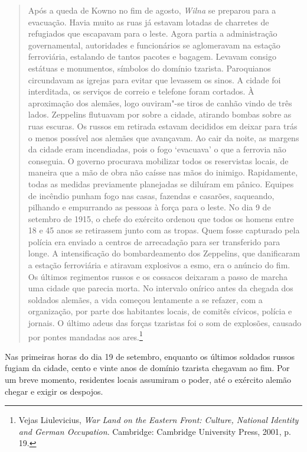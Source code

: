 \begin{quote}
Após a queda de Kowno no fim de agosto, \textit{Wilna} se preparou para a
evacuação. Havia muito as ruas já estavam lotadas de charretes de
refugiados que escapavam para o leste. Agora partia a administração
governamental, autoridades e funcionários se aglomeravam na estação
ferroviária, estalando de tantos pacotes e bagagem. Levavam consigo
estátuas e monumentos, símbolos do domínio tzarista. Paroquianos
circundavam as igrejas para evitar que levassem os sinos. A cidade foi
interditada, os serviços de correio e telefone foram cortados. À
aproximação dos alemães, logo ouviram"-se tiros de canhão vindo de três
lados. Zeppelins flutuavam por sobre a cidade, atirando bombas sobre as
ruas escuras. Os russos em retirada estavam decididos em deixar para
trás o menos possível aos alemães que avançavam. Ao cair da noite, as
margens da cidade eram incendiadas, pois o fogo `evacuava' o que a
ferrovia não conseguia. O governo procurava mobilizar todos os
reservistas locais, de maneira que a mão de obra não caísse nas mãos do
inimigo. Rapidamente, todas as medidas previamente planejadas se
diluíram em pânico. Equipes de incêndio punham fogo nas casas, fazendas
e casarões, saqueando, pilhando e empurrando as pessoas à força para o
leste. No dia 9 de setembro de 1915, o chefe do exército ordenou que
todos os homens entre 18 e 45 anos se retirassem junto com as tropas.
Quem fosse capturado pela polícia era enviado a centros de arrecadação
para ser transferido para longe. A intensificação do bombardeamento dos
Zeppelins, que danificaram a estação ferroviária e atiravam explosivos a
esmo, era o anúncio do fim. Os últimos regimentos russos e os cossacos
deixaram a passo de marcha uma cidade que parecia morta. No intervalo
onírico antes da chegada dos soldados alemães, a vida começou lentamente
a se refazer, com a organização, por parte dos habitantes locais, de
comitês cívicos, polícia e jornais. O último adeus das forças tzaristas
foi o som de explosões, causado por pontes mandadas aos ares.\footnote{Vejas Liulevicius, \textit{War Land on the Eastern Front: Culture, National Identity and German Occupation}. Cambridge: Cambridge University Press, 2001, p. 19.} 
\end{quote}

Nas primeiras horas do dia 19 de setembro, enquanto os últimos soldados
russos fugiam da cidade, cento e vinte anos de domínio tzarista chegavam
ao fim. Por um breve momento, residentes locais assumiram o poder, até o
exército alemão chegar e exigir os despojos.

